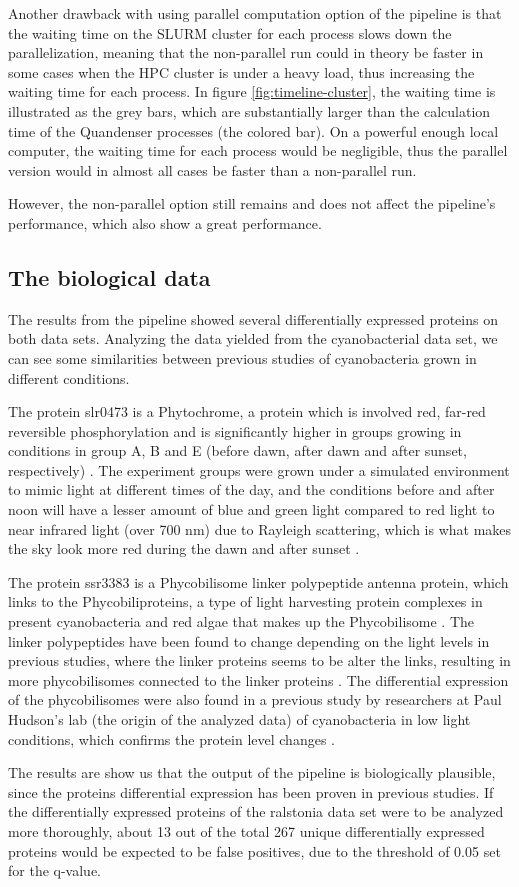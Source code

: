 Another drawback with using parallel computation option of the pipeline is that the waiting time on the SLURM cluster for each process slows down the parallelization, meaning that the non-parallel run could in theory be faster in some cases when the HPC cluster is under a heavy load, thus increasing the waiting time for each process. In figure \ref{fig:timeline-cluster}, the waiting time is illustrated as the grey bars, which are substantially larger than the calculation time of the Quandenser processes (the colored bar). On a powerful enough local computer, the waiting time for each process would be negligible, thus the parallel version would in almost all cases be faster than a non-parallel run.

However, the non-parallel option still remains and does not affect the pipeline's performance, which also show a great performance.

\subsection{The biological data}
The results from the pipeline showed several differentially expressed proteins on both data sets. Analyzing the data yielded from the cyanobacterial data set, we can see some similarities between previous studies of cyanobacteria grown in different conditions.

The protein slr0473 is a Phytochrome, a protein which is involved red, far-red reversible phosphorylation and is significantly higher in groups growing in conditions in group A, B and E (before dawn, after dawn and after sunset, respectively) \cite{phytochrome}. The experiment groups were grown under a simulated environment to mimic light at different times of the day, and the conditions before and after noon will have a lesser amount of blue and green light compared to red light to near infrared light (over 700 nm) due to Rayleigh scattering, which is what makes the sky look more red during the dawn and after sunset \cite{rayleigh}.

The protein ssr3383 is a Phycobilisome linker polypeptide antenna protein, which links to the Phycobiliproteins, a type of light harvesting protein complexes in present cyanobacteria and red algae that makes up the Phycobilisome \cite{phycobilisomes}. The linker polypeptides have been found to change depending on the light levels in previous studies, where the linker proteins seems to be alter the links, resulting in more phycobilisomes connected to the linker proteins \cite{cyano-low-light}. The differential expression of the phycobilisomes were also found in a previous study by researchers at Paul Hudson's lab (the origin of the analyzed data) of cyanobacteria in low light conditions, which confirms the protein level changes \cite{michael-jahn-cyano}.

The results are show us that the output of the pipeline is biologically plausible, since the proteins differential expression has been proven in previous studies. If the differentially expressed proteins of the ralstonia data set were to be analyzed more thoroughly, about 13 out of the total 267 unique  differentially expressed proteins would be expected to be false positives, due to the threshold of 0.05 set for the q-value.
